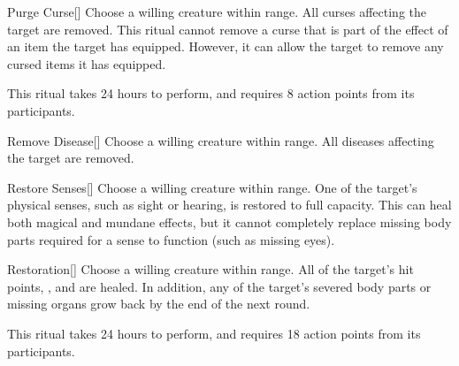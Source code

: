 \lowercase{\hypertarget{spell:Purge Curse}{}}\label{spell:Purge Curse}
\begin{freeability}[\nth{2}]{\hypertarget{spell:Purge Curse}{Purge Curse}}[]
Choose a willing creature within \rngclose range.
All curses affecting the target are removed.
This ritual cannot remove a curse that is part of the effect of an item the target has equipped.
However, it can allow the target to remove any cursed items it has equipped.

This ritual takes 24 hours to perform, and requires 8 action points from its participants.
\end{freeability}
\vspace{0.25em}



\lowercase{\hypertarget{spell:Remove Disease}{}}\label{spell:Remove Disease}
\begin{freeability}[\nth{2}]{\hypertarget{spell:Remove Disease}{Remove Disease}}[]
Choose a willing creature within \rngmed range.
All diseases affecting the target are removed.
\end{freeability}
\vspace{0.25em}



\lowercase{\hypertarget{spell:Restore Senses}{}}\label{spell:Restore Senses}
\begin{freeability}[\nth{2}]{\hypertarget{spell:Restore Senses}{Restore Senses}}[]
Choose a willing creature within \rngmed range.
One of the target's physical senses, such as sight or hearing, is restored to full capacity.
This can heal both magical and mundane effects, but it cannot completely replace missing body parts required for a sense to function (such as missing eyes).
\end{freeability}
\vspace{0.25em}



\lowercase{\hypertarget{spell:Restoration}{}}\label{spell:Restoration}
\begin{freeability}[\nth{3}]{\hypertarget{spell:Restoration}{Restoration}}[]
Choose a willing creature within \rngclose range.
All of the target's hit points, , and  are healed.
In addition, any of the target's severed body parts or missing organs grow back by the end of the next round.

This ritual takes 24 hours to perform, and requires 18 action points from its participants.
\end{freeability}
\vspace{0.25em}



